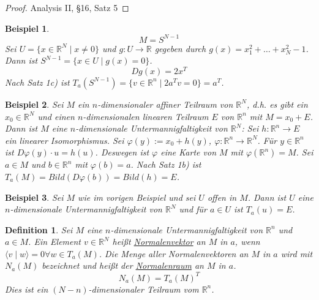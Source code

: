 \documentclass[10pt,a4paper]{report}
\newtheorem*{defi}{Definition}
\newtheorem*{example}{Beispiel}
\begin{document}
\begin{proof}
  Analysis II, §16, Satz 5
\end{proof}

\begin{example}
  \begin{equation}
    M = S^{N - 1}
  \end{equation}
  Sei $U = \{ x \in \mathbb{R}^{N} \mid x \ne 0 \}$ und $g : U \rightarrow \mathbb{R}$ gegeben durch $g(x) = x_{1}^{2} + \dots + x_{N}^{2} - 1$.
  Dann ist $S^{N - 1} = \{ x \in U \mid g(x) = 0 \}$.
  \begin{equation}
    Dg(x) = 2x^{T}
  \end{equation}
  Nach Satz 1c) ist $T_{a}(S^{N - 1}) = \{ v \in \mathbb{R}^{n} \mid 2a^{T}v = 0 \} = a^{T}$.
\end{example}

\begin{example}
  Sei $M$ ein $n$-dimensionaler affiner Teilraum von $\mathbb{R}^{N}$, d.h. es gibt ein $x_{0} \in \mathbb{R}^{N}$ und einen $n$-dimensionalen linearen Teilraum $E$ von $\mathbb{R}^{n}$ mit $M = x_{0} + E$.
  Dann ist $M$ eine $n$-dimensionale Untermannigfaltigkeit von $\mathbb{R}^{N}$: Sei $h : \mathbb{R}^{n} \rightarrow E$ ein linearer Isomorphismus.
  Sei $\varphi(y) := x_{0} + h(y)$, $\varphi : \mathbb{R}^{n} \rightarrow \mathbb{R}^{N}$.
  Für $y \in \mathbb{R}^{n}$ ist $D\varphi(y) \cdot u = h(u)$.
  Deswegen ist $\varphi$ eine Karte von $M$ mit $\varphi(\mathbb{R}^{n}) = M$.
  Sei $a \in M$ und $b \in \mathbb{R}^{n}$ mit $\varphi(b) = a$.
  Nach Satz 1b) ist $T_{a}(M) = Bild(D\varphi(b)) = Bild(h) = E$.
\end{example}

\begin{example}
  Sei $M$ wie im vorigen Beispiel und sei $U$ offen in $M$.
  Dann ist $U$ eine $n$-dimensionale Untermannigfaltigkeit von $\mathbb{R}^{N}$ und für $a \in U$ ist $T_{a}(u) = E$.
\end{example}

\begin{defi}
  Sei $M$ eine $n$-dimensionale Untermannigfaltigkeit von $\mathbb{R}^{n}$ und $a \in M$.
  Ein Element $v \in \mathbb{R}^{N}$ heißt \underline{Normalenvektor} an $M$ in $a$, wenn $\langle v \mid w \rangle = 0 \forall w \in T_{a}(M)$.
  Die Menge aller Normalenvektoren an $M$ in $a$ wird mit $N_{a}(M)$ bezeichnet und heißt der \underline{Normalenraum} an $M$ in $a$.
  \begin{equation}
    N_{a}(M) = T_{a}(M)^{T}
  \end{equation}
  Dies ist ein $(N - n)$-dimensionaler Teilraum vom $\mathbb{R}^{n}$.
\end{defi}
\end{document}
